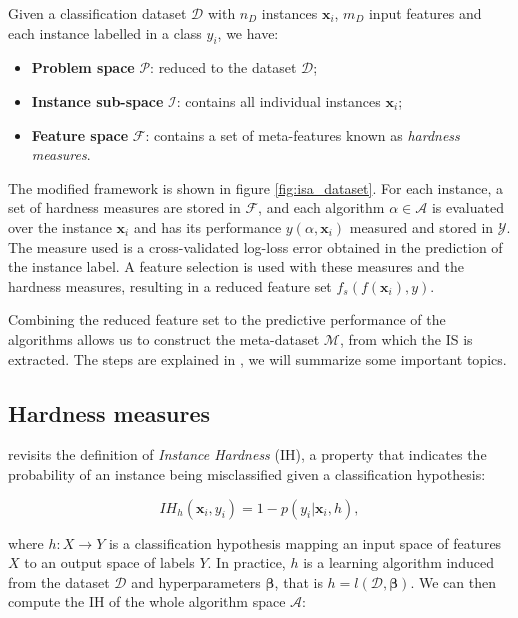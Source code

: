 Given a classification dataset $\mathcal{D}$ with $n_D$ instances $\mathbf{x}_i$, $m_D$ input features and each instance labelled in a class $y_i$, we have:

\begin{itemize}
	\item \textbf{Problem space} $\mathcal{P}$: reduced to the dataset $\mathcal{D}$;
	\item \textbf{Instance sub-space} $\mathcal{I}$: contains all individual instances $\mathbf{x}_i$;
	\item \textbf{Feature space} $\mathcal{F}$: contains a set of meta-features known as \emph{hardness measures}.
\end{itemize}

The modified framework is shown in figure \ref{fig:isa_dataset}. For each instance, a set of hardness measures are stored in $\mathcal{F}$, and each algorithm $\alpha \in \mathcal{A}$ is evaluated over the instance $\mathbf{x}_i$ and has its performance $y(\alpha, \mathbf{x}_i)$ measured and stored in $\mathcal{Y}$. The measure used is a cross-validated log-loss error obtained in the prediction of the instance label. A feature selection is used with these measures and the hardness measures, resulting in a reduced feature set $f_s(f(\mathbf{x}_i), y)$.

Combining the reduced feature set to the predictive performance of the algorithms allows us to construct the meta-dataset $\mathcal{M}$, from which the IS is extracted. The steps are explained in \cite{Lorena2022}, we will summarize some important topics.

\subsection{Hardness measures} \label{subsec:hardness_measures}

\cite{Lorena2022} revisits the definition of \emph{Instance Hardness} (IH), a property that indicates the probability of an instance being misclassified given a classification hypothesis:

\begin{equation} \label{eq:instance_hardness}
	IH_h(\mathbf{x}_i, y_i) = 1 - p(y_i | \mathbf{x}_i, h),
\end{equation}

where $h: X \rightarrow Y$ is a classification hypothesis mapping an input space of features $X$ to an output space of labels $Y$. In practice, $h$ is a learning algorithm induced from the dataset $\mathcal{D}$ and hyperparameters $\mathbf{\beta}$, that is $h = l(\mathcal{D}, \mathbf{\beta})$. We can then compute the IH of the whole algorithm space $\mathcal{A}$:

